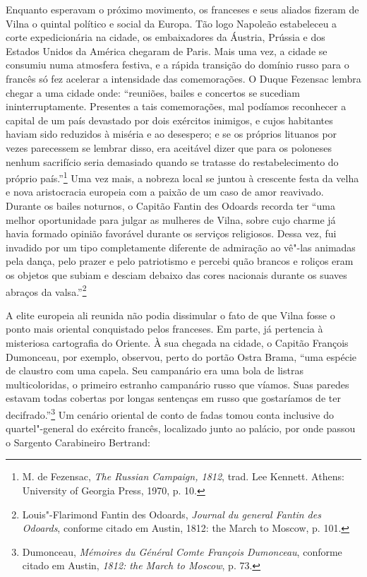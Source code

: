 Enquanto esperavam o próximo movimento, os franceses e seus aliados
fizeram de Vilna o quintal político e social da Europa. Tão logo
Napoleão estabeleceu a corte expedicionária na cidade, os embaixadores
da Áustria, Prússia e dos Estados Unidos da América chegaram de Paris.
Mais uma vez, a cidade se consumiu numa atmosfera festiva, e a rápida
transição do domínio russo para o francês só fez acelerar a intensidade
das comemorações. O Duque Fezensac lembra chegar a uma cidade onde:
``reuniões, bailes e concertos se sucediam ininterruptamente. Presentes
a tais comemorações, mal podíamos reconhecer a capital de um país
devastado por dois exércitos inimigos, e cujos habitantes haviam sido
reduzidos à miséria e ao desespero; e se os próprios lituanos por vezes
parecessem se lembrar disso, era aceitável dizer que para os poloneses
nenhum sacrifício seria demasiado quando se tratasse do restabelecimento
do próprio país.''\footnote{M. de Fezensac, \textit{The Russian Campaign, 1812}, trad. Lee Kennett. Athens: University of Georgia Press, 1970, p. 10.} Uma vez mais, a nobreza local se juntou à crescente festa da velha e nova aristocracia europeia com a paixão de um caso de amor
reavivado. Durante os bailes noturnos, o Capitão Fantin des Odoards
recorda ter ``uma melhor oportunidade para julgar as mulheres de Vilna,
sobre cujo charme já havia formado opinião favorável durante os serviços
religiosos. Dessa vez, fui invadido por um tipo completamente diferente
de admiração ao vê"-las animadas pela dança, pelo prazer e pelo
patriotismo e percebi quão brancos e roliços eram os objetos que subiam
e desciam debaixo das cores nacionais durante os suaves abraços da
valsa.''\footnote{Louis"-Flarimond Fantin des Odoards, \textit{Journal du general Fantin des Odoards}, conforme citado em Austin, 1812: the March to Moscow, p. 101.}

A elite europeia ali reunida não podia dissimular o fato de que Vilna
fosse o ponto mais oriental conquistado pelos franceses. Em parte, já
pertencia à misteriosa cartografia do Oriente. À sua chegada na cidade,
o Capitão François Dumonceau, por exemplo, observou, perto do portão
Ostra Brama, ``uma espécie de claustro com uma capela. Seu campanário
era uma bola de listras multicoloridas, o primeiro estranho campanário
russo que víamos. Suas paredes estavam todas cobertas por longas
sentenças em russo que gostaríamos de ter decifrado.''\footnote{Dumonceau, \textit{Mémoires du Général Comte François Dumonceau}, conforme citado em Austin, \textit{1812: the March to Moscow}, p. 73.} Um cenário oriental de conto de fadas tomou conta inclusive do quartel"-general do
exército francês, localizado junto ao palácio, por onde passou o
Sargento Carabineiro Bertrand:

